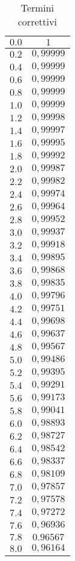 \documentclass[]{article}
\begin{document}
\begin{table}
\begin{tabular}{||c|c||}
    $0.0$ & $1$ \\\hline
    $0.2$ & $0,99999$ \\\hline
    $0.4$ & $0,99999$ \\\hline
    $0.6$ & $0,99999$ \\\hline
    $0.8$ & $0,99999$ \\\hline
    $1.0$ & $0,99999$ \\\hline
    $1.2$ & $0,99998$ \\\hline
    $1.4$ & $0,99997$ \\\hline
    $1.6$ & $0,99995$ \\\hline
    $1.8$ & $0,99992$ \\\hline
    $2.0$ & $0,99987$ \\\hline
    $2.2$ & $0,99982$ \\\hline
    $2.4$ & $0,99974$ \\\hline
    $2.6$ & $0,99964$ \\\hline
    $2.8$ & $0,99952$ \\\hline
    $3.0$ & $0,99937$ \\\hline
    $3.2$ & $0,99918$ \\\hline
    $3.4$ & $0,99895$ \\\hline
    $3.6$ & $0,99868$ \\\hline
    $3.8$ & $0,99835$ \\\hline
    $4.0$ & $0,99796$ \\\hline
    $4.2$ & $0,99751$ \\\hline
    $4.4$ & $0,99698$ \\\hline
    $4.6$ & $0,99637$ \\\hline
    $4.8$ & $0,99567$ \\\hline
    $5.0$ & $0,99486$ \\\hline
    $5.2$ & $0,99395$ \\\hline
    $5.4$ & $0,99291$ \\\hline
    $5.6$ & $0,99173$ \\\hline
    $5.8$ & $0,99041$ \\\hline
    $6.0$ & $0,98893$ \\\hline
    $6.2$ & $0,98727$ \\\hline
    $6.4$ & $0,98542$ \\\hline
    $6.6$ & $0,98337$ \\\hline
    $6.8$ & $0,98109$ \\\hline
    $7.0$ & $0,97857$ \\\hline
    $7.2$ & $0,97578$ \\\hline
    $7.4$ & $0,97272$ \\\hline
    $7.6$ & $0,96936$ \\\hline
    $7.8$ & $0.96567$ \\\hline
    $8.0$ & $0,96164$ \\\hline

\end{tabular}
\caption{Termini correttivi}
\label{termine_correttivo}
\end{table}
\end{document}
